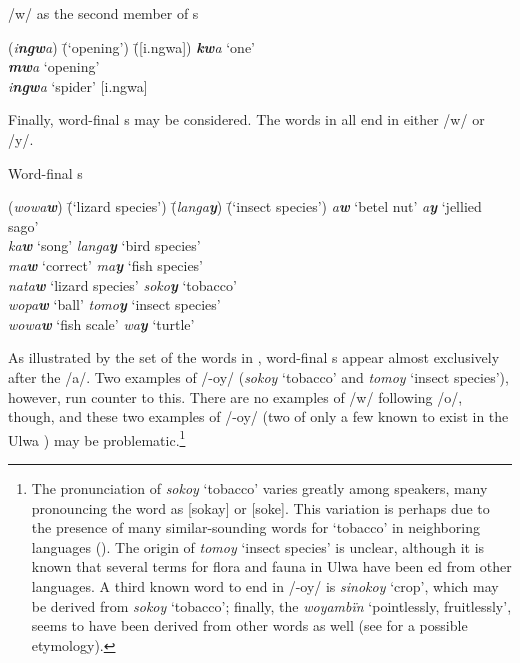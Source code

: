 \ea%
    \label{ex:phon:41}
          /w/ as the second member of s\\
\begin{tabbing}
{(\textit{i\textbf{ngw}a})} \= {(‘opening’)} \= {([i.ngwa])}\kill
{\textit{\textbf{kw}a}} \> {‘one’} \> { }\\
{\textit{\textbf{mw}a}} \> {‘opening’} \> { }\\
{\textit{i\textbf{ngw}a}} \> {‘spider’} \> {[i.ngwa]}
\end{tabbing}
\z

Finally, word-final s may be considered. The words in  all end in either /w/ or /y/.

\ea%
    \label{ex:phon:42}
          Word-final s\\
\begin{tabbing}
{(\textit{wowa\textbf{w}})} \= {(‘lizard species’)} \= {(\textit{langa\textbf{y}})} \= {(‘insect species’)}\kill
{\textit{a\textbf{w}}} \> {‘betel nut’} \> {\textit{a\textbf{y}}} \> {‘jellied sago’}\\
{\textit{ka\textbf{w}}} \> {‘song’} \> {\textit{langa\textbf{y}}} \> {‘bird species’}\\
{\textit{ma\textbf{w}}} \> {‘correct’} \> {\textit{ma\textbf{y}}} \> {‘fish species’}\\
{\textit{nata\textbf{w}}} \> {‘lizard species’} \> {\textit{soko\textbf{y}}} \> {‘tobacco’}\\
{\textit{wopa\textbf{w}}} \> {‘ball’} \> {\textit{tomo\textbf{y}}} \> {‘insect species’}\\
{\textit{wowa\textbf{w}}} \> {‘fish scale’} \> {\textit{wa\textbf{y}}} \> {‘turtle’}
\end{tabbing}
\z

As illustrated by the set of the words in , word-final s appear almost exclusively after the  /a/. Two examples of /-oy/ (\textit{sokoy} ‘tobacco’ and \textit{tomoy} ‘insect species’), however, run counter to this. There are no examples of /w/ following /o/, though, and these two examples of /-oy/ (two of only a few known to exist in the Ulwa ) may be problematic.\footnote{The pronunciation of \textit{sokoy} ‘tobacco’ varies greatly among speakers, many pronouncing the word as [sokay] or [soke]. This variation is perhaps due to the presence of many similar-sounding words for ‘tobacco’ in neighboring languages (). The origin of \textit{tomoy} ‘insect species’ is unclear, although it is known that several terms for flora and fauna in Ulwa have been ed from other languages. A third known word to end in /-oy/ is \textit{sinokoy} ‘crop’, which may be derived from \textit{sokoy} ‘tobacco’; finally, the  \textit{woyambïn} ‘pointlessly, fruitlessly’, seems to have been derived from other words as well (see  for a possible etymology).}

